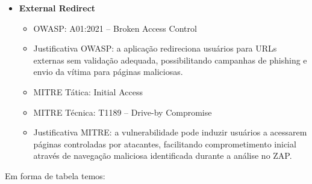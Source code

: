 \begin{itemize}
\begin{itemize}
      \item MITRE Tática: Initial Access
      \item MITRE Técnica: T1190 -- Exploit Public-Facing Application

      \item Justificativa MITRE: a exploração ocorre diretamente sobre a
        aplicação web pública, permitindo acesso indevido a arquivos do
        servidor através de parâmetros manipulados detectados pelo OWASP ZAP.
    \end{itemize}

  \item \textbf{External Redirect}
    \begin{itemize}
      \item OWASP: A01:2021 -- Broken Access Control
      \item Justificativa OWASP: a aplicação redireciona usuários para URLs
        externas sem validação adequada, possibilitando campanhas de phishing e
        envio da vítima para páginas maliciosas.

      \item MITRE Tática: Initial Access
      \item MITRE Técnica: T1189 -- Drive-by Compromise

      \item Justificativa MITRE: a vulnerabilidade pode induzir usuários a
        acessarem páginas controladas por atacantes, facilitando
        comprometimento inicial através de navegação maliciosa identificada
        durante a análise no ZAP.
    \end{itemize}
\end{itemize}

\newpage

Em forma de tabela temos:

